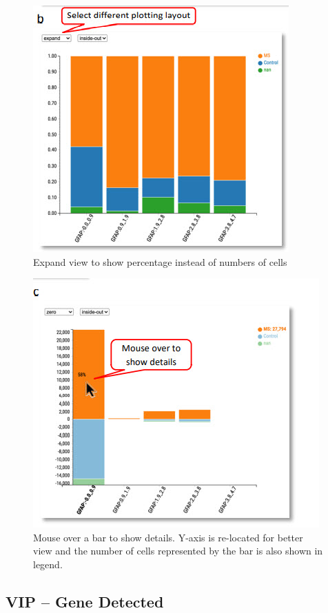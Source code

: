 \documentclass[
]{article}
\begin{document}
\begin{figure}
\centering
\includegraphics{figures/F17B.jpg}
\caption{Expand view to show percentage instead of numbers of cells}
\end{figure}

\begin{figure}
\centering
\includegraphics{figures/F17C.jpg}
\caption{Mouse over a bar to show details. Y-axis is re-located for better view and the number of cells represented by the bar is also shown in legend.}
\end{figure}

\hypertarget{vip-gene-detected}{%
\subsection{VIP -- Gene Detected}\label{vip-gene-detected}}
\end{document}
